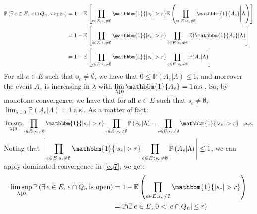 \documentclass[10pt,a4paper]{amsart}
\theoremstyle{exampstyle}
\theoremstyle{exampnotations}
\begin{document}
\begin{align}
     \nonumber \mathbb{P}\left(\exists \, e \in E, \, e \cap Q_n \, \text{is open} \right) &= 1 - \mathbb{E}\left[\prod_{e \in E : s_e \neq \emptyset} \mathbbm{1}\lbrace \vert s_e \vert > r \rbrace\mathbb{E}\left( \prod_{e \in E \, : s_e \neq \emptyset}  \mathbbm{1}\lbrace A_e \rbrace  \Bigg\vert \Lambda \right) \right] \\ \nonumber &= 1 - \mathbb{E}\left[\prod_{e \in E : s_e \neq \emptyset} \mathbbm{1}\lbrace \vert s_e \vert > r \rbrace \prod_{e \in E \, : s_e \neq \emptyset}\mathbb{E}\left(   \mathbbm{1}\lbrace A_e \rbrace  \vert \Lambda \right) \right] \\ \label{eq7} &= 1 - \mathbb{E}\left[\prod_{e \in E : s_e \neq \emptyset} \mathbbm{1}\lbrace \vert s_e \vert > r \rbrace \prod_{e \in E \, : s_e \neq \emptyset}\mathbb{P}\left( A_e  \vert \Lambda \right) \right] 
\end{align}
For all $e \in E$ such that $s_e \neq \emptyset$, we have that $0 \leq \mathbb{P}(A_e \vert \Lambda) \leq 1$, and moreover the event $A_e$ is increasing in $\lambda$ with $\displaystyle \lim_{\lambda \downarrow 0} \mathbbm{1}\lbrace A_e \rbrace = 1 \: \text{a.s.}$. So, by monotone convergence, we have that for all $e \in E$ such that $s_e \neq \emptyset$, $\displaystyle \lim_{\lambda \downarrow 0} \mathbb{P}(A_e \vert \Lambda) = 1 \: \text{a.s.}$. As a matter of fact:
\begin{equation*}
    \limsup_{\lambda \downarrow 0} \prod_{e \in E : s_e \neq \emptyset} \mathbbm{1}\lbrace \vert s_e \vert > r \rbrace \prod_{e \in E \, : s_e \neq \emptyset}\mathbb{P}\left(    A_e  \vert \Lambda \right) = \prod_{e \in E : s_e \neq \emptyset} \mathbbm{1}\lbrace \vert s_e \vert > r \rbrace \quad \text{a.s.}
\end{equation*}
Noting that $\displaystyle \Bigg\lvert \prod_{e \in E : s_e \neq \emptyset} \mathbbm{1}\lbrace \vert s_e \vert > r \rbrace \prod_{e \in E \, : s_e \neq \emptyset}\mathbb{P}\left(    A_e  \vert \Lambda \right) \Bigg\rvert \leq 1$, we can apply dominated convergence in~\eqref{eq7}, we get:
\begin{align}
   \nonumber  \limsup_{\lambda \downarrow 0} \mathbb{P}\left(\exists \, e \in E, \, e \cap Q_n \, \text{is open} \right) &= 1 - \mathbb{E}\left(\prod_{e \in E : s_e \neq \emptyset} \mathbbm{1}\lbrace \vert s_e \vert > r \rbrace \right) \\ \label{eq8} &= \mathbb{P}(\exists \, e \in E, \, 0 < \vert e \cap Q_n \vert \leq r)
\end{align}
\end{document}
